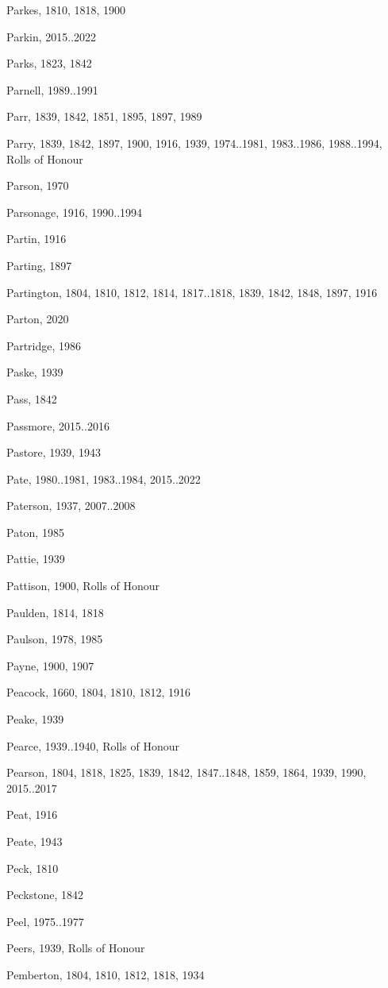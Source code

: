 \begin{theindex}
\item Parkes, 1810, 1818, 1900
\item Parkin, 2015..2022
\item Parks, 1823, 1842
\item Parnell, 1989..1991
\item Parr, 1839, 1842, 1851, 1895, 1897, 1989
\item Parry, 1839, 1842, 1897, 1900, 1916, 1939, 1974..1981, 1983..1986, 1988..1994, Rolls of Honour
\item Parson, 1970
\item Parsonage, 1916, 1990..1994
\item Partin, 1916
\item Parting, 1897
\item Partington, 1804, 1810, 1812, 1814, 1817..1818, 1839, 1842, 1848, 1897, 1916
\item Parton, 2020
\item Partridge, 1986
\item Paske, 1939
\item Pass, 1842
\item Passmore, 2015..2016
\item Pastore, 1939, 1943
\item Pate, 1980..1981, 1983..1984, 2015..2022
\item Paterson, 1937, 2007..2008
\item Paton, 1985
\item Pattie, 1939
\item Pattison, 1900, Rolls of Honour
\item Paulden, 1814, 1818
\item Paulson, 1978, 1985
\item Payne, 1900, 1907
\item Peacock, 1660, 1804, 1810, 1812, 1916
\item Peake, 1939
\item Pearce, 1939..1940, Rolls of Honour
\item Pearson, 1804, 1818, 1825, 1839, 1842, 1847..1848, 1859, 1864, 1939, 1990, 2015..2017
\item Peat, 1916
\item Peate, 1943
\item Peck, 1810
\item Peckstone, 1842
\item Peel, 1975..1977
\item Peers, 1939, Rolls of Honour
\item Pemberton, 1804, 1810, 1812, 1818, 1934

\end{theindex}
